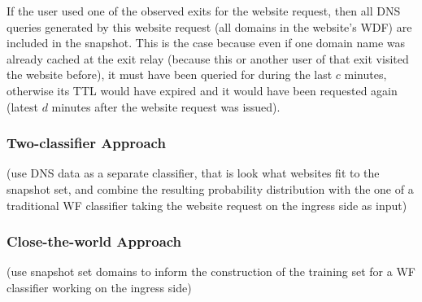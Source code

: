 If the user used one of the observed exits for the website request, then
all DNS queries generated by this website request (\ie all domains in
the website's WDF) are included in the snapshot. This is the case
because even if one domain name was already cached at the exit relay
(because this or another user of that exit visited the website before),
it must have been queried for during the last $c$ minutes, otherwise its
TTL would have expired and it would have been requested again (latest
$d$ minutes after the website request was issued).

\subsubsection{Two-classifier Approach}
(use DNS data as a separate classifier, that is look what websites fit
to the snapshot set, and combine the resulting probability distribution
with the one of a traditional WF classifier taking the website request
on the ingress side as input)


\subsubsection{Close-the-world Approach}
(use snapshot set domains to inform the construction of the training set
for a WF classifier working on the ingress side)
